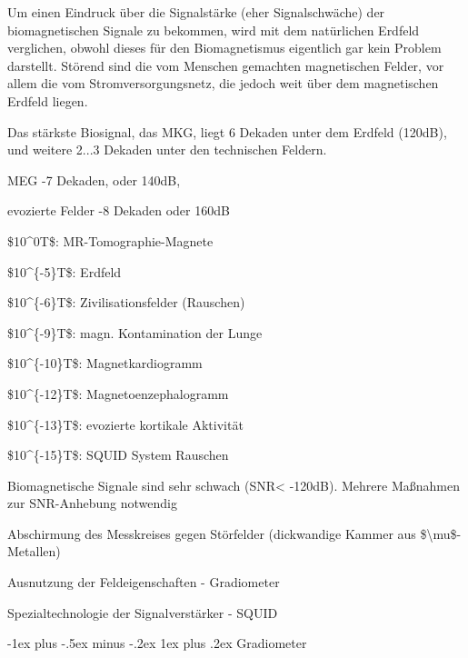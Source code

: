 \documentclass[a4paper]{article}
\makeatletter
\renewcommand{\subsubsection}{\@startsection{subsubsection}{3}{0mm}%
 {-1ex plus -.5ex minus -.2ex}%
 {1ex plus .2ex}%
 {\normalfont\small\bfseries}}
\makeatother
\begin{document}
\begin{multicols}{3}
  Um einen Eindruck über die Signalstärke (eher Signalschwäche) der
  biomagnetischen Signale zu bekommen, wird mit dem natürlichen Erdfeld
  verglichen, obwohl dieses für den Biomagnetismus eigentlich gar kein
  Problem darstellt. Störend sind die vom Menschen gemachten magnetischen
  Felder, vor allem die vom Stromversorgungsnetz, die jedoch weit über dem
  magnetischen Erdfeld liegen.

  \begin{enumerate*}
    \def\labelenumi{\arabic{enumi}.}
    \item Das stärkste Biosignal, das MKG, liegt 6 Dekaden unter dem Erdfeld (120dB), und weitere 2...3 Dekaden unter den technischen Feldern.
    \item MEG -7 Dekaden, oder 140dB,
    \item evozierte Felder -8 Dekaden oder 160dB
  \end{enumerate*}

  \begin{itemize*}
    \item \$10\^{}0T\$: MR-Tomographie-Magnete
    \item \$10\^{}\{-5\}T\$: Erdfeld
    \item \$10\^{}\{-6\}T\$: Zivilisationsfelder (Rauschen)
    \item \$10\^{}\{-9\}T\$: magn. Kontamination der Lunge
    \item \$10\^{}\{-10\}T\$: Magnetkardiogramm
    \item \$10\^{}\{-12\}T\$: Magnetoenzephalogramm
    \item \$10\^{}\{-13\}T\$: evozierte kortikale Aktivität
    \item \$10\^{}\{-15\}T\$: SQUID System Rauschen
  \end{itemize*}

  Biomagnetische Signale sind sehr schwach (SNR\textless{} -120dB).
  Mehrere Maßnahmen zur SNR-Anhebung notwendig

  \begin{itemize*}
    \item Abschirmung des Messkreises gegen Störfelder (dickwandige Kammer aus \$\textbackslash mu\$-Metallen)
    \item Ausnutzung der Feldeigenschaften - Gradiometer
    \item Spezialtechnologie der Signalverstärker - SQUID
  \end{itemize*}

  \subsubsection{Gradiometer}\label{gradiometer}


\end{multicols}
\end{document}
